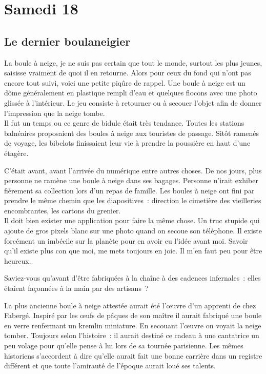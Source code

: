 ﻿\section*{Samedi 18}
\subsection*{Le dernier boulaneigier}

La boule à neige, je ne suis pas certain que tout le monde, surtout les plus jeunes, saisisse vraiment de quoi il en retourne. Alors pour ceux du fond qui n’ont pas encore tout suivi, voici une petite piqûre de rappel. Une boule à neige est un dôme généralement en plastique rempli d’eau et quelques flocons avec une photo glissée à l’intérieur. Le jeu consiste à retourner ou à secouer l’objet afin de donner l’impression que la neige tombe. \\
Il fut un temps ou ce genre de bidule était très tendance. Toutes les stations balnéaires proposaient des boules à neige aux touristes de passage. Sitôt ramenés de voyage, les bibelots finissaient leur vie à prendre la poussière en haut d’une étagère.

C’était avant, avant l’arrivée du numérique entre autres choses. De nos jours, plus personne ne ramène une boule à neige dans ses bagages. Personne n’irait exhiber fièrement sa collection lors d’un repas de famille. Les boules à neige ont fini par prendre le même chemin que les diapositives : direction le cimetière des vieilleries encombrantes, les cartons du grenier. \\
Il doit bien exister une application pour faire la même chose. Un truc stupide qui ajoute de gros pixels blanc sur une photo quand on secoue son téléphone. Il existe forcément un imbécile sur la planète pour en avoir eu l’idée avant moi.
Savoir qu’il existe plus con que moi, me mets toujours en joie. Il m’en faut peu pour être heureux.

Saviez-vous qu’avant d’être fabriquées à la chaîne à des cadences infernales : elles étaient façonnées à la main par des artisans ?

La plus ancienne boule à neige attestée aurait été l’œuvre d’un apprenti de chez Fabergé. Inspiré par les œufs de pâques de son maître il aurait fabriqué une boule en verre renfermant un kremlin miniature. En secouant l’œuvre on voyait la neige tomber. Toujours selon l’histoire : il aurait destiné ce cadeau à une cantatrice un peu volage pour qu’elle pense à lui lors de sa tournée parisienne. Les mêmes historiens s’accordent à dire qu’elle aurait fait une bonne carrière dans un registre différent et que toute l’amirauté de l’époque aurait loué ses talents.


